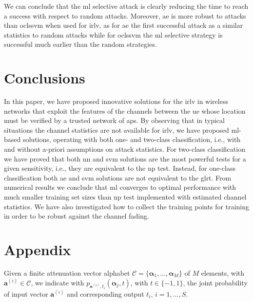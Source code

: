 \documentclass[draftcls,onecolumn,12pt]{IEEEtran}
\begin{document}
We can conclude that the \ac{ml} selective attack is clearly reducing the time to reach a success with respect to random attacks. Moreover, \ac{ae} is more robust to attacks than \ac{oclssvm} when used for \ac{irlv}, as for \ac{ae} the first successful attack as a similar statistics to random attacks while for \ac{oclssvm} the \ac{ml} selective strategy is  successful much earlier than the random strategies. 



\section{Conclusions}

In this paper, we have proposed innovative solutions for the \ac{irlv} in wireless networks that exploit the features of the channels between the \ac{ue} whose location must be verified by a trusted network of \acp{ap}. By observing that in typical situations the channel statistics are not available for \ac{irlv}, we have proposed \ac{ml}-based solutions, operating with both one- and two-class classification, i.e., with and without a-priori assumptions on attack statistics. For two-class classification we have proved that  both \ac{nn} and \ac{svm} solutions  are the most powerful tests for a given sensitivity, i.e., they are equivalent to the \ac{np} test. Instead, for one-class classification both \ac{ae} and \ac{svm} solutions are not equivalent to the \ac{glrt}. From numerical results we conclude that \ac{ml} converges to optimal performance with much smaller training set sizes than \ac{np} test implemented with estimated channel statistics. We have also investigated how to collect the training points for training in order to be robust against the channel fading.

\section*{Appendix}

	Given a finite  attenuation vector alphabet $\mathcal C = \{\bm{\alpha}_1, \ldots, \bm{\alpha}_M\}$ of $M$ elements, with $\bm{a}^{(i)} \in \mathcal C$, we indicate with $p_{\bm{a}^{(i)},t_i}(\bm{\alpha}_j, t)$, with $t \in \{-1,1\}$, the joint probability of input vector $\bm{a}^{(i)}$ and corresponding output $t_i$, $i=1, \ldots, S$.
	
\end{document}
